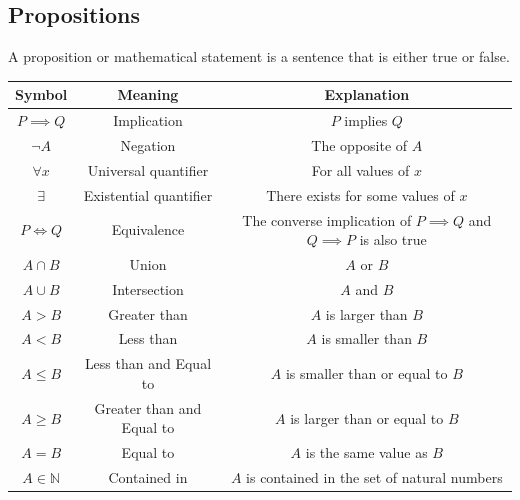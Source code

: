\documentclass[a4paper,10pt]{report}
\begin{document}
\subsection{Propositions}
A proposition or mathematical statement is a sentence that is either true or false.
\begin{center}
	\begin{tabular}{c|c|c}
		Symbol                & Meaning                   & Explanation                                                                \\ \hline
		$P \implies Q$        & Implication               & $P$ implies $Q$                                                            \\
		$\lnot A$             & Negation                  & The opposite of $A$                                                        \\
		$\forall x$           & Universal quantifier      & For all values of $x$                                                      \\
		$\exists $            & Existential quantifier    & There exists for some values of $x$                                        \\
		$P \Leftrightarrow Q$ & Equivalence               & The converse implication of $P \implies Q$ and $Q \implies P$ is also true \\
		$A \cap B$            & Union                     & $A$ or $B$                                                                 \\
		$A \cup B$            & Intersection              & $A$ and $B$                                                                \\
		$A > B$               & Greater than              & $A$ is larger than $B$                                                     \\
		$A < B$               & Less than                 & $A$ is smaller than $B$                                                    \\
		$A \leq B$            & Less than and Equal to    & $A$ is smaller than or equal to $B$                                        \\
		$A \geq B$            & Greater than and Equal to & $A$ is larger than or equal to $B$                                         \\
		$A = B$               & Equal to                  & $A$ is the same value as $B$                                               \\
		$A \in \mathbb{N}$    & Contained in              & $A$ is contained in the set of natural numbers                             \\
	\end{tabular}
\end{center}
\end{document}
